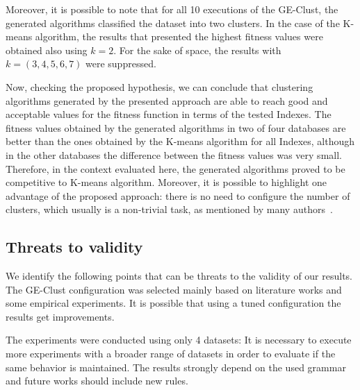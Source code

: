\documentclass[conference]{IEEEtran}
\begin{document}
	
	Moreover, it is possible to note that for all 10 executions of the GE-Clust, the generated algorithms classified the dataset into two clusters. In the case of the K-means algorithm, the results that presented the highest fitness values were obtained also using $k=2$. For the sake of space, the results with $k = (3,4,5,6,7)$ were suppressed.
	
	
	
	
	
	Now, checking the proposed hypothesis, we can conclude that clustering algorithms generated by the presented approach are able to reach good and acceptable values for the fitness function in terms of the tested Indexes. The fitness values obtained by the generated algorithms in two of four databases are better than the ones obtained by the K-means algorithm for all Indexes, although in the other databases the difference between the fitness values was very small. Therefore, in the context evaluated here, the generated algorithms proved to be competitive to K-means algorithm. Moreover, it is possible to highlight one advantage of the proposed approach: there is no need to configure the number of clusters, which usually is a non-trivial task, as mentioned by many authors~\cite{tibshirani2001estimating}.
	
	
	\subsection{Threats to validity}
	
	
	We identify the following points that can be threats to the validity of our results. The GE-Clust configuration was selected mainly based on literature works and some empirical experiments. It is possible that using a tuned configuration the results get improvements.
	
	The experiments were conducted using only 4 datasets: It is necessary to execute more experiments with a broader range of datasets in order to evaluate if the same behavior is maintained. The results strongly depend on the used grammar and future works should include new rules.
	
\end{document}
